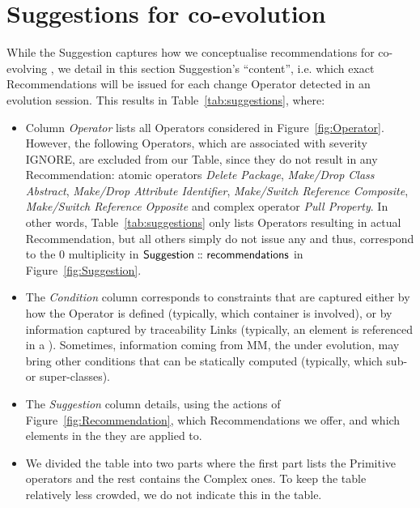 \section{Suggestions for \viewtype co-evolution} 
\label{sec:Approach}


While the \textsf{Suggestion} \metamodel captures how we
conceptualise recommendations for co-evolving \viewtypes, we detail
in this section \textsf{Suggestion}'s ``content'', i.e. which exact \textsf{Recommendation}s
will be issued for each change \textsf{Operator} detected in an evolution
session. This results in Table~\ref{tab:suggestions}, where:
\begin{itemize}
	\item Column \textsl{Operator} lists all \textsf{Operator}s considered in Figure~\ref{fig:Operator}. 
    However, the following \textsf{Operator}s, which are
	associated with severity \textsf{IGNORE}, are excluded from our Table, since 
	they do not result in any \textsf{Recommendation}: atomic operators \textit{Delete Package}, 
	\textit{Make/Drop Class Abstract}, \textit{Make/Drop Attribute Identifier}, 
	\textit{Make/Switch Reference Composite}, \textit{Make/Switch Reference Opposite}
	and complex operator \textit{Pull Property}. In other words, Table~\ref{tab:suggestions} only
	lists \textsf{Operator}s resulting in actual \textsf{Recommendation}, but all
	others simply do not issue any and thus, correspond to the \textsf{0} multiplicity
	in $\mathsf{Suggestion} \,\colon\!\!\!\colon \mathsf{recommendations}$ in Figure~\ref{fig:Suggestion}.
	
	\item The \textsl{Condition} column corresponds to constraints that are captured
	either by how the \textsf{Operator} is defined (typically, which \textsf{container}
	is involved), or by information captured by traceability \textsf{Link}s (typically,
	an element is referenced in a \viewtype). Sometimes, information coming from \textsf{MM},
	the \metamodel under evolution, may bring other conditions that can be statically
	computed (typically, which sub- or super-classes). 
	
	\item The \textsl{Suggestion} column details, using the actions of Figure~\ref{fig:Recommendation}, which \textsf{Recommendation}s we offer, and which elements in the \viewtype they are applied to.

    \item We divided the table into two parts where the first part lists the \textsf{Primitive} operators and the rest contains the \textsf{Complex} ones. To keep the table relatively less crowded, we do not indicate this in the table.
\end{itemize}



